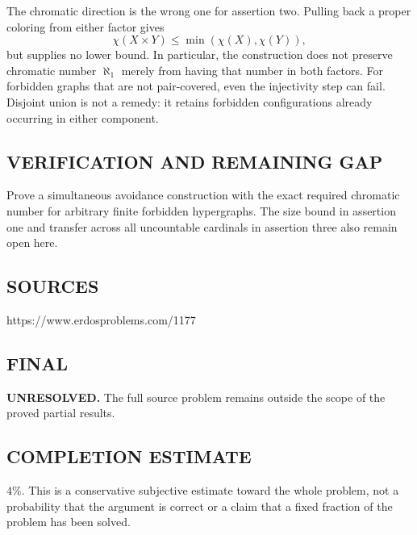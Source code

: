 The chromatic direction is the wrong one for assertion two. Pulling back a
proper coloring from either factor gives
\[\chi(X\times Y)\le\min(\chi(X),\chi(Y)),\]
but supplies no lower bound. In particular, the construction does not preserve
chromatic number $\aleph_1$ merely from having that number in both factors.
For forbidden graphs that are not pair-covered, even the injectivity step can
fail. Disjoint union is not a remedy: it retains forbidden configurations
already occurring in either component.

\subsection*{VERIFICATION AND REMAINING GAP}
Prove a simultaneous avoidance construction with the exact required chromatic
number for arbitrary finite forbidden hypergraphs. The size bound in assertion
one and transfer across all uncountable cardinals in assertion three also remain open here.

\subsection*{SOURCES}
https://www.erdosproblems.com/1177

\subsection*{FINAL}
\textbf{UNRESOLVED.} The full source problem remains outside the scope of the proved partial results.

\subsection*{COMPLETION ESTIMATE}
$4\%$. This is a conservative subjective estimate toward the whole problem, not a probability that the argument is correct or a claim that a fixed fraction of the problem has been solved.
